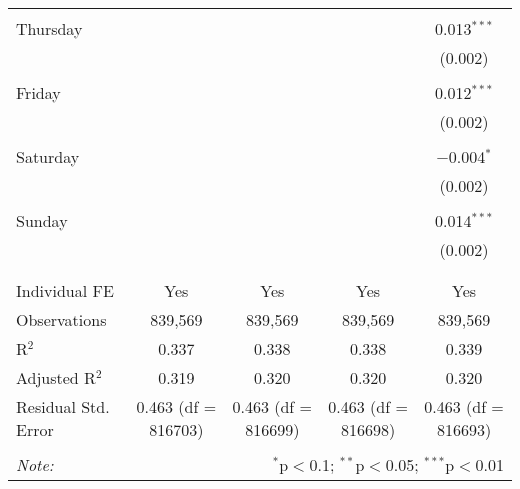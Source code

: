 \documentclass[
]{article}
\begin{document}
\begin{table}[!htbp]
{\begin{tabular}{@{\extracolsep{5pt}}lcccc}
  & & & & \\ 
 Thursday &  &  &  & 0.013$^{***}$ \\ 
  &  &  &  & (0.002) \\ 
  & & & & \\ 
 Friday &  &  &  & 0.012$^{***}$ \\ 
  &  &  &  & (0.002) \\ 
  & & & & \\ 
 Saturday &  &  &  & $-$0.004$^{*}$ \\ 
  &  &  &  & (0.002) \\ 
  & & & & \\ 
 Sunday &  &  &  & 0.014$^{***}$ \\ 
  &  &  &  & (0.002) \\ 
  & & & & \\ 
\hline \\[-1.8ex] 
Individual FE & Yes & Yes & Yes & Yes \\ 
Observations & 839,569 & 839,569 & 839,569 & 839,569 \\ 
R$^{2}$ & 0.337 & 0.338 & 0.338 & 0.339 \\ 
Adjusted R$^{2}$ & 0.319 & 0.320 & 0.320 & 0.320 \\ 
Residual Std. Error & 0.463 (df = 816703) & 0.463 (df = 816699) & 0.463 (df = 816698) & 0.463 (df = 816693) \\ 
\hline 
\hline \\[-1.8ex] 
\textit{Note:}  & \multicolumn{4}{r}{$^{*}$p$<$0.1; $^{**}$p$<$0.05; $^{***}$p$<$0.01} \\ 
\end{tabular}
} 
\end{table} 
\newpage
\end{document}

